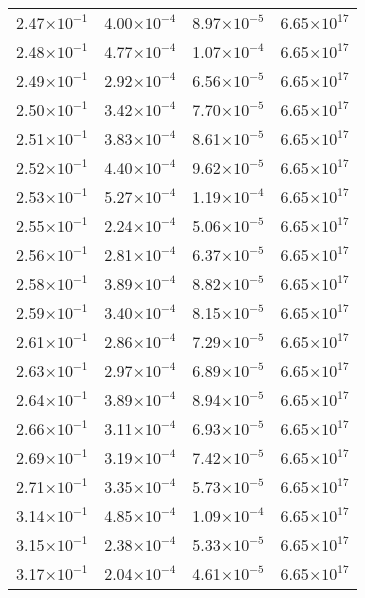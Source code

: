 \documentclass{aa}
\begin{document}
{\begin{longtable}{c|c|c|c}
2.47$\times 10^{-1}$ & 4.00$\times 10^{-4}$ & 8.97$\times 10^{-5}$ & 6.65$\times 10^{17}$  \\
2.48$\times 10^{-1}$ & 4.77$\times 10^{-4}$ & 1.07$\times 10^{-4}$ & 6.65$\times 10^{17}$  \\
2.49$\times 10^{-1}$ & 2.92$\times 10^{-4}$ & 6.56$\times 10^{-5}$ & 6.65$\times 10^{17}$  \\
2.50$\times 10^{-1}$ & 3.42$\times 10^{-4}$ & 7.70$\times 10^{-5}$ & 6.65$\times 10^{17}$  \\
2.51$\times 10^{-1}$ & 3.83$\times 10^{-4}$ & 8.61$\times 10^{-5}$ & 6.65$\times 10^{17}$  \\
2.52$\times 10^{-1}$ & 4.40$\times 10^{-4}$ & 9.62$\times 10^{-5}$ & 6.65$\times 10^{17}$  \\
2.53$\times 10^{-1}$ & 5.27$\times 10^{-4}$ & 1.19$\times 10^{-4}$ & 6.65$\times 10^{17}$  \\
2.55$\times 10^{-1}$ & 2.24$\times 10^{-4}$ & 5.06$\times 10^{-5}$ & 6.65$\times 10^{17}$  \\
2.56$\times 10^{-1}$ & 2.81$\times 10^{-4}$ & 6.37$\times 10^{-5}$ & 6.65$\times 10^{17}$  \\
2.58$\times 10^{-1}$ & 3.89$\times 10^{-4}$ & 8.82$\times 10^{-5}$ & 6.65$\times 10^{17}$  \\
2.59$\times 10^{-1}$ & 3.40$\times 10^{-4}$ & 8.15$\times 10^{-5}$ & 6.65$\times 10^{17}$  \\
2.61$\times 10^{-1}$ & 2.86$\times 10^{-4}$ & 7.29$\times 10^{-5}$ & 6.65$\times 10^{17}$  \\
2.63$\times 10^{-1}$ & 2.97$\times 10^{-4}$ & 6.89$\times 10^{-5}$ & 6.65$\times 10^{17}$  \\
2.64$\times 10^{-1}$ & 3.89$\times 10^{-4}$ & 8.94$\times 10^{-5}$ & 6.65$\times 10^{17}$  \\
2.66$\times 10^{-1}$ & 3.11$\times 10^{-4}$ & 6.93$\times 10^{-5}$ & 6.65$\times 10^{17}$  \\
2.69$\times 10^{-1}$ & 3.19$\times 10^{-4}$ & 7.42$\times 10^{-5}$ & 6.65$\times 10^{17}$  \\
2.71$\times 10^{-1}$ & 3.35$\times 10^{-4}$ & 5.73$\times 10^{-5}$ & 6.65$\times 10^{17}$  \\
3.14$\times 10^{-1}$ & 4.85$\times 10^{-4}$ & 1.09$\times 10^{-4}$ & 6.65$\times 10^{17}$  \\
3.15$\times 10^{-1}$ & 2.38$\times 10^{-4}$ & 5.33$\times 10^{-5}$ & 6.65$\times 10^{17}$  \\
3.17$\times 10^{-1}$ & 2.04$\times 10^{-4}$ & 4.61$\times 10^{-5}$ & 6.65$\times 10^{17}$  \\

\end{longtable}}
\end{document}
